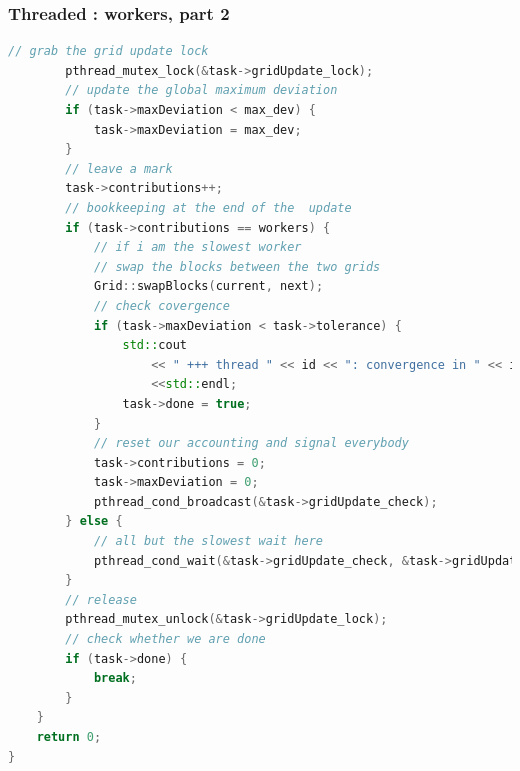 \begin{frame}[fragile]
% 
  \frametitle{Threaded : workers, part 2}
%
  \begin{lstlisting}[language=c++,name=Jacobi:updated-solve,basicstyle=\tt\bfseries\tiny]
        // grab the grid update lock
        pthread_mutex_lock(&task->gridUpdate_lock);
        // update the global maximum deviation 
        if (task->maxDeviation < max_dev) {
            task->maxDeviation = max_dev;
        }
        // leave a mark
        task->contributions++;
        // bookkeeping at the end of the  update
        if (task->contributions == workers) {
            // if i am the slowest worker
            // swap the blocks between the two grids
            Grid::swapBlocks(current, next);
            // check covergence
            if (task->maxDeviation < task->tolerance) {
                std::cout
                    << " +++ thread " << id << ": convergence in " << iteration << " iterations"
                    <<std::endl;
                task->done = true;
            }
            // reset our accounting and signal everybody
            task->contributions = 0;
            task->maxDeviation = 0;
            pthread_cond_broadcast(&task->gridUpdate_check);
        } else {
            // all but the slowest wait here
            pthread_cond_wait(&task->gridUpdate_check, &task->gridUpdate_lock);
        } 
        // release
        pthread_mutex_unlock(&task->gridUpdate_lock);
        // check whether we are done
        if (task->done) {
            break;
        }
    }
    return 0;
}
  \end{lstlisting}
%
\end{frame}


